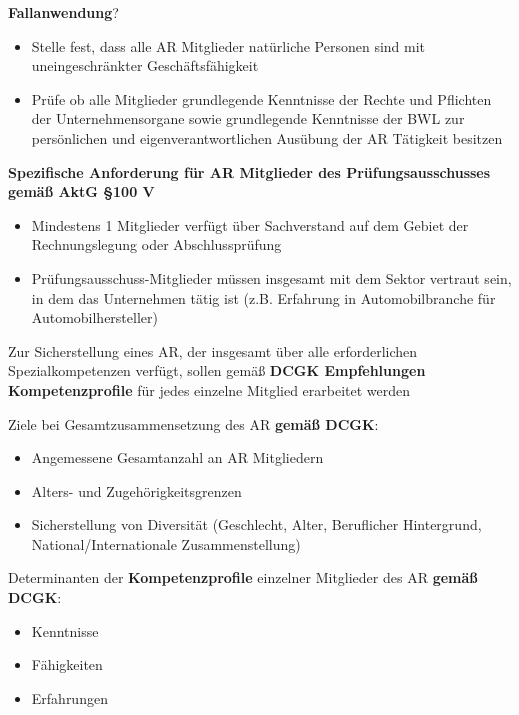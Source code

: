 \documentclass[
]{article}
\providecommand{\tightlist}{%
  \setlength{\itemsep}{0pt}\setlength{\parskip}{0pt}}
\begin{document}
\textbf{Fallanwendung}?

\begin{itemize}
\tightlist
\item
  Stelle fest, dass alle AR Mitglieder natürliche Personen sind mit
  uneingeschränkter Geschäftsfähigkeit
\item
  Prüfe ob alle Mitglieder grundlegende Kenntnisse der Rechte und
  Pflichten der Unternehmensorgane sowie grundlegende Kenntnisse der BWL
  zur persönlichen und eigenverantwortlichen Ausübung der AR Tätigkeit
  besitzen
\end{itemize}

\textbf{Spezifische Anforderung für AR Mitglieder des
Prüfungsausschusses gemäß AktG §100 V}

\begin{itemize}
\tightlist
\item
  Mindestens 1 Mitglieder verfügt über Sachverstand auf dem Gebiet der
  Rechnungslegung oder Abschlussprüfung
\item
  Prüfungsausschuss-Mitglieder müssen insgesamt mit dem Sektor vertraut
  sein, in dem das Unternehmen tätig ist (z.B. Erfahrung in
  Automobilbranche für Automobilhersteller)
\end{itemize}

Zur Sicherstellung eines AR, der insgesamt über alle erforderlichen
Spezialkompetenzen verfügt, sollen gemäß \textbf{DCGK Empfehlungen
Kompetenzprofile} für jedes einzelne Mitglied erarbeitet werden

Ziele bei Gesamtzusammensetzung des AR \textbf{gemäß DCGK}:

\begin{itemize}
\tightlist
\item
  Angemessene Gesamtanzahl an AR Mitgliedern
\item
  Alters- und Zugehörigkeitsgrenzen
\item
  Sicherstellung von Diversität (Geschlecht, Alter, Beruflicher
  Hintergrund, National/Internationale Zusammenstellung)
\end{itemize}

Determinanten der \textbf{Kompetenzprofile} einzelner Mitglieder des AR
\textbf{gemäß DCGK}:

\begin{itemize}
\tightlist
\item
  Kenntnisse
\item
  Fähigkeiten
\item
  Erfahrungen
\end{itemize}
\end{document}
